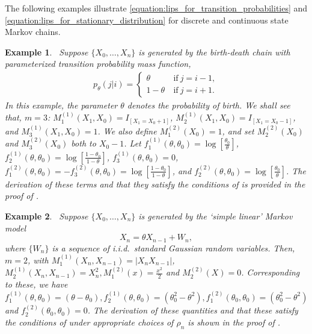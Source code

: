 \documentclass[11pt]{amsart}
\newcommand{\data}{X_0,\dots,X_n}
\newtheorem{example}{Example}[section]
\begin{document}
The following examples illustrate \cref{equation:lips_for_transition_probabilities} and \cref{equation:lips_for_stationary_distribution} for discrete and continuous state Markov chains. 
\begin{example}~\label{example:bd}
Suppose $\{\data\}$ is generated by the birth-death chain with parameterized transition probability mass function,
\begin{align*}
    p_{\theta}(j|i) = \begin{cases}
    \theta &~\text{if}~j=i-1,\\
    1-\theta&~\text{if}~j=i+1.
    \end{cases}
\end{align*}
In this example, the parameter $\theta$ denotes the probability of birth. We shall see that, $m=3$: $M^{(1)}_1(X_1,X_0)=I_{[X_1=X_0+1]}$, $M^{(1)}_2(X_1,X_0)=I_{[X_1=X_0-1]}$, and $M^{(1)}_3(X_1,X_0) = 1$. 
We also define $M^{(2)}_1(X_0)=1$, and set $M^{(2)}_2(X_0)$ and $M^{(2)}_3(X_0)$ both to $X_0-1$. Let $f^{(1)}_1(\theta,\theta_0) = \log\left[\frac{\theta_0}{\theta}\right]$,  $f^{(1)}_2(\theta,\theta_0) =\log\left[\frac{1-\theta_0}{1-\theta}\right]$, $f^{(1)}_3(\theta,\theta_0)=0$,
$f^{(2)}_1(\theta,\theta_0)=-f^{(2)}_3(\theta,\theta_0)=\log\left[\frac{1-\theta_0}{1-\theta}\right]$, and  $f^{(2)}_2(\theta,\theta_0)=\log\left[\frac{\theta_0}{\theta}\right]$. 
The derivation of these terms and that they satisfy the conditions of  is provided in the proof of .
\end{example}

\begin{example}~\label{example:slm}
Suppose $\{\data\}$ is generated by the `simple linear' Markov model %
\begin{equation*}
    X_n=\theta X_{n-1}+W_n,
\end{equation*}
where $\{W_n\}$ is a sequence of i.i.d.\ standard Gaussian random variables. 
Then, $m = 2$, with %
$M^{(1)}_1(X_n,X_{n-1})=|X_nX_{n-1}|$, $M^{(1)}_2(X_n,X_{n-1})=X_n^2, M^{(2)}_1(x)=\frac{x^2}{2}$ and $M^{(2)}_2(X)=0$.
Corresponding to these, we have $f^{(1)}_1(\theta,\theta_0)=(\theta-\theta_0), f^{(1)}_2(\theta,\theta_0)=(\theta_0^2-\theta^2) ,f^{(2)}_1(\theta_0,\theta_0)=(\theta_0^2-\theta^2)$ and $f^{(2)}_2(\theta_0,\theta_0)=0$. The derivation of these quantities and that these satisfy the conditions of  under appropriate choices of $\rho_n$ is shown in the proof of .
\end{example}
\end{document}
